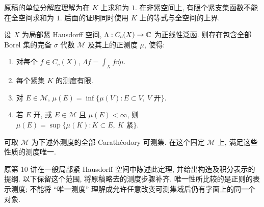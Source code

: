 \begin{remark}
原稿的单位分解应理解为在 $K$ 上求和为 $1$. 在非紧空间上, 有限个紧支集函数不能在全空间求和为 $1$. 后面的证明同时使用 $K$ 上的等式与全空间的上界.
\end{remark}


\begin{theorem}\label{ra:c4:riesz}
设 $X$ 为局部紧 Hausdorff 空间, $\Lambda:C_c(X)\to\mathbb C$ 为正线性泛函. 则存在包含全部 Borel 集的完备 $\sigma$ 代数 $\mathcal M$ 及其上的正测度 $\mu$, 使得:
\begin{enumerate}
\item 对每个 $f\in C_c(X)$, $\Lambda f=\int_X f\dd\mu$.
\item 每个紧集 $K$ 的测度有限.
\item 对 $E\in\mathcal M$, $\mu(E)=\inf\{\mu(V):E\subset V,\ V\text{ 开}\}$.
\item 若 $E$ 开, 或 $E\in\mathcal M$ 且 $\mu(E)<\infty$, 则 $\mu(E)=\sup\{\mu(K):K\subset E,\ K\text{ 紧}\}$.
\end{enumerate}
可取 $\mathcal M$ 为下述外测度的全部 Carath\'eodory 可测集. 在这个固定 $\mathcal M$ 上, 满足这些性质的测度唯一.
\end{theorem}

原第 10 讲在一般局部紧 Hausdorff 空间中陈述此定理, 并给出构造及积分表示的提纲. 以下保留这个范围, 将原稿略去的测度步骤补齐. 唯一性所比较的是正则的表示测度; 不能将 ``唯一测度'' 理解成允许任意改变可测集域后仍有字面上的同一个对象.

